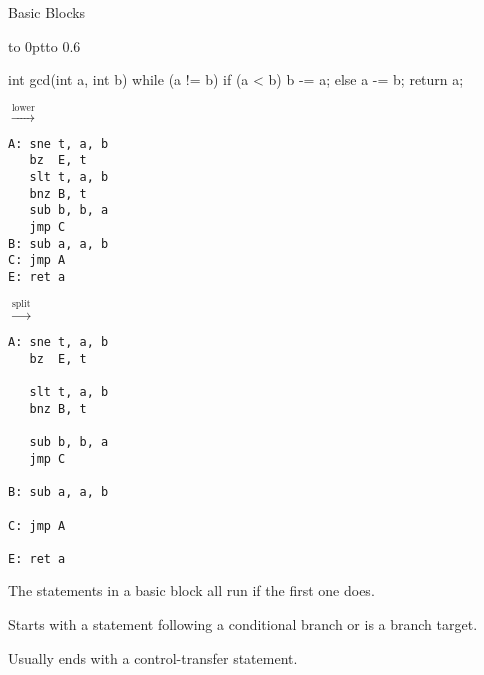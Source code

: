 \documentclass{plt}
\begin{document}
\begin{frame}[fragile=singleslide]{Basic Blocks}

\vbox to 0pt{\vss\hbox to 0.6\vskip 1pc\vss}

\begin{minipage}{0.3\textwidth}
\begin{C}
int gcd(int a, int b) {
  while (a != b) {
    if (a < b) b -= a;
    else a -= b;
  }
  return a;
}
\end{C}

\end{minipage}
%
$\stackrel{\textrm{lower}}{\rightarrow}$
%
\begin{minipage}{0.25\textwidth}
\fontsize{8}{8}\selectfont
\begin{verbatim}
A: sne t, a, b
   bz  E, t
   slt t, a, b
   bnz B, t
   sub b, b, a
   jmp C
B: sub a, a, b
C: jmp A
E: ret a
\end{verbatim}
\end{minipage}
%
$\stackrel{\textrm{split}}{\rightarrow}$
%
\begin{minipage}{0.25\textwidth}
\fontsize{8}{8}\selectfont
\begin{verbatim}
A: sne t, a, b
   bz  E, t

   slt t, a, b
   bnz B, t

   sub b, b, a
   jmp C

B: sub a, a, b

C: jmp A

E: ret a
\end{verbatim}
\end{minipage}

The statements in a basic block all run if the first one does.

Starts with a statement following a conditional branch or is a branch target.

Usually ends with a control-transfer statement.

\end{frame}
\end{document}

